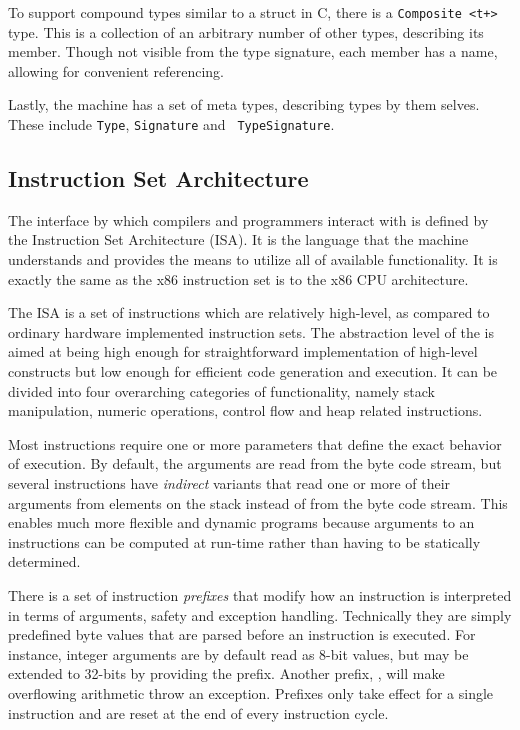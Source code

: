 
To support compound types similar to a struct in C, there is a {\tt Composite
  <t+>} type. This is a collection of an arbitrary number of other types,
describing its member. Though not visible from the type signature, each member
has a name, allowing for convenient referencing.

Lastly, the machine has a set of meta types, describing types by them
selves. These include {\tt Type}, {\tt Signature} and {\tt
  TypeSignature}. %

\subsection{Instruction Set Architecture}
\label{sec:design:isa}

The interface by which compilers and programmers interact with \thename{} is
defined by the Instruction Set Architecture (ISA). It is the language that the
machine understands and provides the means to utilize all of available
functionality. It is exactly the same as the x86 instruction set is to the x86
CPU architecture.

The \thename{} ISA is a set of instructions which are relatively high-level, as
compared to ordinary hardware implemented instruction sets. The abstraction
level of the \thename{} is aimed at being high enough for straightforward
implementation of high-level constructs but low enough for efficient code
generation and execution. It can be divided into four overarching categories of
functionality, namely stack manipulation, numeric operations, control flow and
heap related instructions.

Most instructions require one or more parameters that define the exact behavior
of execution. By default, the arguments are read from the byte code stream, but
several instructions have \emph{indirect} variants that read one or more of
their arguments from elements on the stack instead of from the byte code
stream. This enables much more flexible and dynamic programs because arguments
to an instructions can be computed at run-time rather than having to be
statically determined.

There is a set of instruction \emph{prefixes} that modify how an instruction is
interpreted in terms of arguments, safety and exception handling. Technically
they are simply predefined byte values that are parsed before an instruction is
executed. For instance, integer arguments are by default read as 8-bit values,
but may be extended to 32-bits by providing the  prefix. Another
prefix, , will make overflowing arithmetic throw an
exception. Prefixes only take effect for a single instruction and are reset at
the end of every instruction cycle.

